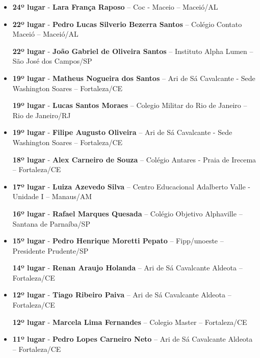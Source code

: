 \documentclass{article}
\begin{document}
\begin{itemize}
\item
\textbf{24º lugar} - \textbf{Lara França Raposo} – Coc - Maceio – Maceió/AL


\item
\textbf{22º lugar} - \textbf{Pedro Lucas Silverio Bezerra Santos} – Colégio Contato Maceió – Maceió/AL


\textbf{22º lugar} - \textbf{João Gabriel de Oliveira Santos} – Instituto Alpha Lumen – São José dos Campos/SP



\item
\textbf{19º lugar} - \textbf{Matheus Nogueira dos Santos} – Ari de Sá Cavalcante - Sede Washington Soares – Fortaleza/CE


\textbf{19º lugar} - \textbf{Lucas Santos Moraes} – Colegio Militar do Rio de Janeiro – Rio de Janeiro/RJ



\item
\textbf{19º lugar} - \textbf{Filipe Augusto Oliveira} – Ari de Sá Cavalcante - Sede Washington Soares – Fortaleza/CE


\textbf{18º lugar} - \textbf{Alex Carneiro de Souza} – Colégio Antares - Praia de Irecema – Fortaleza/CE



\item
\textbf{17º lugar} - \textbf{Luiza Azevedo Silva} – Centro Educacional Adalberto Valle - Unidade I – Manaus/AM


\textbf{16º lugar} - \textbf{Rafael Marques Quesada} – Colégio Objetivo Alphaville – Santana de Parnaíba/SP



\item
\textbf{15º lugar} - \textbf{Pedro Henrique Moretti Pepato} – Fipp/unoeste – Presidente Prudente/SP


\textbf{14º lugar} - \textbf{Renan Araujo Holanda} – Ari de Sá Cavalcante Aldeota – Fortaleza/CE



\item
\textbf{12º lugar} - \textbf{Tiago Ribeiro Paiva} – Ari de Sá Cavalcante Aldeota – Fortaleza/CE


\textbf{12º lugar} - \textbf{Marcela Lima Fernandes} – Colegio Master – Fortaleza/CE



\item
\textbf{11º lugar} - \textbf{Pedro Lopes Carneiro Neto} – Ari de Sá Cavalcante Aldeota – Fortaleza/CE



\end{itemize}
\end{document}

